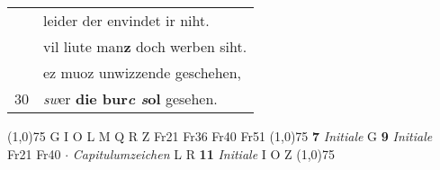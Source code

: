 \documentclass[8pt,a4paper,notitlepage]{article}
\begin{document}
\begin{table}[ht]
\begin{minipage}[t]{0.5\linewidth}
\begin{tabular}{rl}
 & leider der envindet ir niht.\\ 
 & vil liute man\textbf{z} doch werben siht.\\ 
 & ez muoz unwizzende geschehen,\\ 
30 & \textit{sw}er \textbf{die bur\textit{c} \textit{s}ol} gesehen.\\ 
\end{tabular}
\scriptsize
\line(1,0){75} \newline
G I O L M Q R Z Fr21 Fr36 Fr40 Fr51 \newline
\line(1,0){75} \newline
\textbf{7} \textit{Initiale} G  \textbf{9} \textit{Initiale} Fr21 Fr40   $\cdot$ \textit{Capitulumzeichen} L R  \textbf{11} \textit{Initiale} I O Z  \newline
\line(1,0){75} \newline

\end{minipage}
\end{table}
\end{document}
